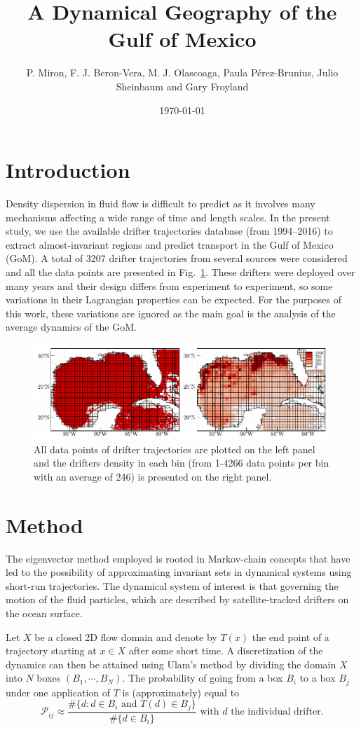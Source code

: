 \documentclass[final]{beamer}
\title
[Gulf of Mexico Oil Spill \& Ecosystem Science Conference, February 5--10 2017, New Orleans, USA] %
{ %
A Dynamical Geography of the Gulf of Mexico
}
\author{ %
P. Miron\inst{1}, %
F. J. Beron-Vera\inst{1},
M. J. Olascoaga\inst{1},
 Paula P\'erez-Brunius\inst{2}, 
 Julio Sheinbaum\inst{2} and 
 Gary Froyland\inst{3}
}
\institute
[Very Large University] %
{
\inst{1} Rosenstiel School of Marine and Atmospheric Science, University of Miami, USA
\\[0.3ex]
\inst{2} CICESE, Ensenada, Mexico
\\[0.3ex]
\inst{3} University of New South Wales, Sydney, Australia
}
\date{\today}
\newcommand{\PF}{\mathcal{P}}
\newcommand{\gom}{GoM}
\begin{document}
\begin{frame}[t]
\begin{multicols}{3}

\section{Introduction}
Density dispersion in fluid flow is difficult to predict as it involves many mechanisms affecting a wide range of time and length scales. In the present study, we use the available drifter trajectories database (from 1994--2016) to extract almost-invariant regions and predict transport in the Gulf of Mexico (\gom). A total of 3207 drifter trajectories from several sources were considered and all the data points are presented in Fig.~\ref{fig:gom}. These drifters were deployed over many years and their design differs from experiment to experiment, so some variations in their Lagrangian properties can be expected.  For the purposes of this work, these variations are ignored as the main goal is the analysis of the average dynamics of the \gom.
\begin{figure}
\centering
\includegraphics[width=0.9\columnwidth]{figures/fig03}
\caption{All data points of drifter trajectories are plotted on the left panel and the drifters density in each bin (from 1-4266 data points per bin with an average of 246) is presented on the right panel.}
\label{fig:gom}
\end{figure}

\section{Method}
The eigenvector method\citep{froyland2014well} employed is rooted in Markov-chain concepts that have led to the possibility of approximating invariant sets in dynamical systems using short-run trajectories\citep{dellnitz1997almost}. The dynamical system of interest is that governing the motion of the fluid particles, which are described by satellite-tracked drifters on the ocean surface.

Let $X$ be a closed 2D flow domain and denote by $T(x)$ the end point of a trajectory starting at $x \in X$ after some short time. A discretization of the dynamics can then be attained using Ulam's method\citep{ulam1960,Froyland-01} by dividing the domain $X$ into $N$ boxes $\left(B_1,\cdots,B_N\right)$. The probability of going from a box  $B_i$ to a box $B_j$ under one application of $T$ is (approximately) equal to
\begin{equation*}
 \PF_{ij} \approx \frac{\#\lbrace d: d \in B_i \text{ and } T(d) \in B_j\rbrace}{\#\lbrace d \in B_i\rbrace} \text{ with } d \text{ the individual drifter.}
\end{equation*}


\end{multicols}
\end{frame}
\end{document}
